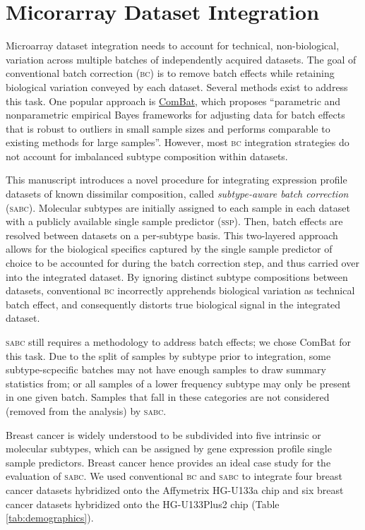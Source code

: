 \documentclass{article}\usepackage[]{graphicx}\usepackage[]{color}
\begin{document}
\section{Micorarray Dataset Integration}
\label{sec:integration}
Microarray dataset integration needs to account for technical, non-biological,
variation across multiple batches of independently acquired datasets.  The goal
of conventional batch correction (\textsc{bc}) is to remove batch effects while
retaining biological variation conveyed by each dataset.  Several methods exist
to address this task.  One popular approach is
\href{https://www.bu.edu/jlab/wp-assets/ComBat/Abstract.html}{\textsf{ComBat}},
which proposes ``parametric and nonparametric empirical Bayes frameworks for
adjusting data for batch effects that is robust to outliers in small sample
sizes and performs comparable to existing methods for large samples''.  However,
most \textsc{bc} integration strategies do not account for imbalanced subtype
composition within datasets.

This manuscript introduces a novel procedure for integrating expression profile
datasets of known dissimilar composition, called \emph{subtype-aware batch
  correction} (\textsc{sabc}).  Molecular subtypes are initially assigned to
each sample in each dataset with a publicly available single sample predictor
(\textsc{ssp}).  Then, batch effects are resolved between datasets on a
per-subtype basis.  This two-layered approach allows for the biological
specifics captured by the single sample predictor of choice to be accounted for
during the batch correction step, and thus carried over into the integrated
dataset.  By ignoring distinct subtype compositions between datasets,
conventional \textsc{bc} incorrectly apprehends biological variation as
technical batch effect, and consequently distorts true biological signal in the
integrated dataset.

\textsc{sabc} still requires a methodology to address batch effects; we chose
\textsf{ComBat} for this task.  Due to the split of samples by subtype prior to
integration, some subtype-scpecific batches may not have enough samples to draw
summary statistics from; or all samples of a lower frequency subtype may only be
present in one given batch.  Samples that fall in these categories are not
considered (removed from the analysis) by \textsc{sabc}.

Breast cancer is widely understood to be subdivided into five intrinsic or
molecular subtypes, which can be assigned by gene expression profile single
sample predictors.  Breast cancer hence provides an ideal case study for the
evaluation of \textsc{sabc}.  We used conventional \textsc{bc} and \textsc{sabc}
to integrate four breast cancer datasets hybridized onto the \textsf{Affymetrix}
HG-U133a chip and six breast cancer datasets hybridized onto the
HG-U133Plus2 chip (Table \ref{tab:demographics}).
\end{document}
